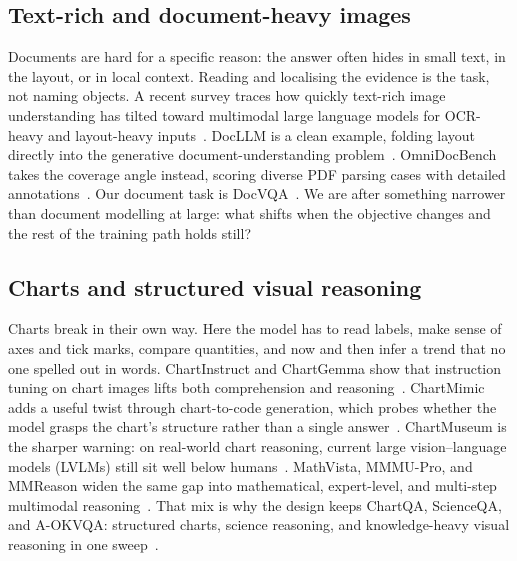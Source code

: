 \documentclass[preprint,12pt]{elsarticle}
\begin{document}
\subsection{Text-rich and document-heavy images}
Documents are hard for a specific reason: the answer often hides in small text, in the layout, or in local context.
Reading and localising the evidence is the task, not naming objects.
A recent survey traces how quickly text-rich image understanding has tilted toward multimodal large language models for OCR-heavy and layout-heavy inputs~\cite{fu2025textrichsurvey}.
DocLLM is a clean example, folding layout directly into the generative document-understanding problem~\cite{wang2024docllm}.
OmniDocBench takes the coverage angle instead, scoring diverse PDF parsing cases with detailed annotations~\cite{ouyang2025omnidocbench}.
Our document task is DocVQA~\cite{mathew2021docvqa}.
We are after something narrower than document modelling at large: what shifts when the objective changes and the rest of the training path holds still?

\subsection{Charts and structured visual reasoning}
Charts break in their own way.
Here the model has to read labels, make sense of axes and tick marks, compare quantities, and now and then infer a trend that no one spelled out in words.
ChartInstruct and ChartGemma show that instruction tuning on chart images lifts both comprehension and reasoning~\cite{masry2024chartinstruct,masry2025chartgemma}.
ChartMimic adds a useful twist through chart-to-code generation, which probes whether the model grasps the chart's structure rather than a single answer~\cite{yang2025chartmimic}.
ChartMuseum is the sharper warning: on real-world chart reasoning, current large vision--language models (LVLMs) still sit well below humans~\cite{tang2025chartmuseum}.
MathVista, MMMU-Pro, and MMReason widen the same gap into mathematical, expert-level, and multi-step multimodal reasoning~\cite{lu2024mathvista,yue2025mmmupro,yao2025mmreason}.
That mix is why the design keeps ChartQA, ScienceQA, and A-OKVQA: structured charts, science reasoning, and knowledge-heavy visual reasoning in one sweep~\cite{masry2022chartqa,lu2022scienceqa,schwenk2022aokvqa}.
\end{document}
